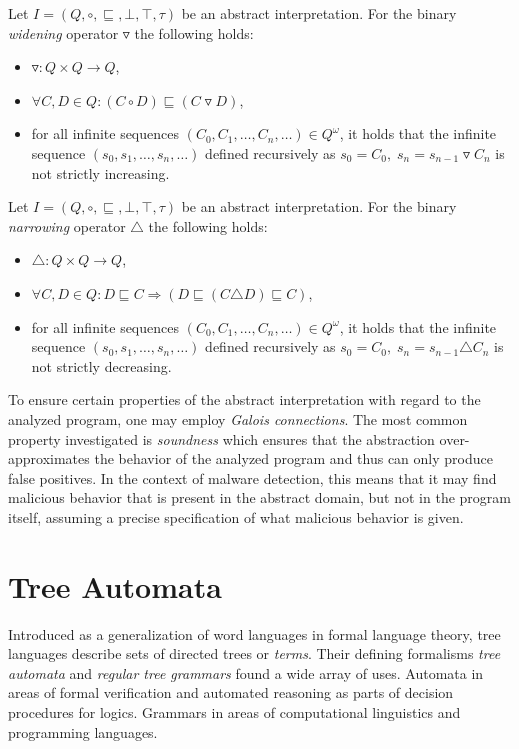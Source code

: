 \begin{defn}
Let $I = (Q, \circ, \sqsubseteq, \bot, \top, \tau)$ be an abstract interpretation. For the binary \emph{widening} operator $\triangledown$ the following holds:
\begin{itemize}
    \item $\triangledown: Q \times Q \rightarrow Q$,
    \item $\forall C,D \in Q: (C \circ D) \sqsubseteq (C \triangledown D)$,
    \item for all infinite sequences $(C_0, C_1, \dots, C_n, \dots) \in Q^\omega$, it holds that the infinite sequence $(s_0, s_1, \dots, s_n, \dots)$ defined recursively as $s_0 = C_0, \; s_n = s_{n-1} \triangledown C_n$ is not strictly increasing.
\end{itemize}
\end{defn}

\begin{defn}
Let $I = (Q, \circ, \sqsubseteq, \bot, \top, \tau)$ be an abstract interpretation. For the binary \emph{narrowing} operator $\triangle$ the following holds:
\begin{itemize}
    \item $\triangle: Q \times Q \rightarrow Q$,
    \item $\forall C,D \in Q: D \sqsubseteq C \Rightarrow (D \sqsubseteq (C \triangle D) \sqsubseteq C)$,
    \item for all infinite sequences $(C_0, C_1, \dots, C_n, \dots) \in Q^\omega$, it holds that the infinite sequence $(s_0, s_1, \dots, s_n, \dots)$ defined recursively as $s_0 = C_0, \; s_n = s_{n-1} \triangle C_n$ is not strictly decreasing.
\end{itemize}
\end{defn}

To ensure certain properties of the abstract interpretation with regard to the analyzed program, one may employ \emph{Galois connections}. The most common property investigated is \emph{soundness} which ensures that the abstraction over-approximates the behavior of the analyzed program and thus can only produce false positives. In the context of malware detection, this means that it may find malicious behavior that is present in the abstract domain, but not in the program itself, assuming a precise specification of what malicious behavior is given.

\section{Tree Automata}
Introduced as a generalization of word languages in formal language theory, tree languages describe sets of directed trees or \emph{terms}. Their defining formalisms \emph{tree automata} and \emph{regular tree grammars} found a wide array of uses. Automata in areas of formal verification and automated reasoning as parts of decision procedures for logics. Grammars in areas of computational linguistics and programming languages.

